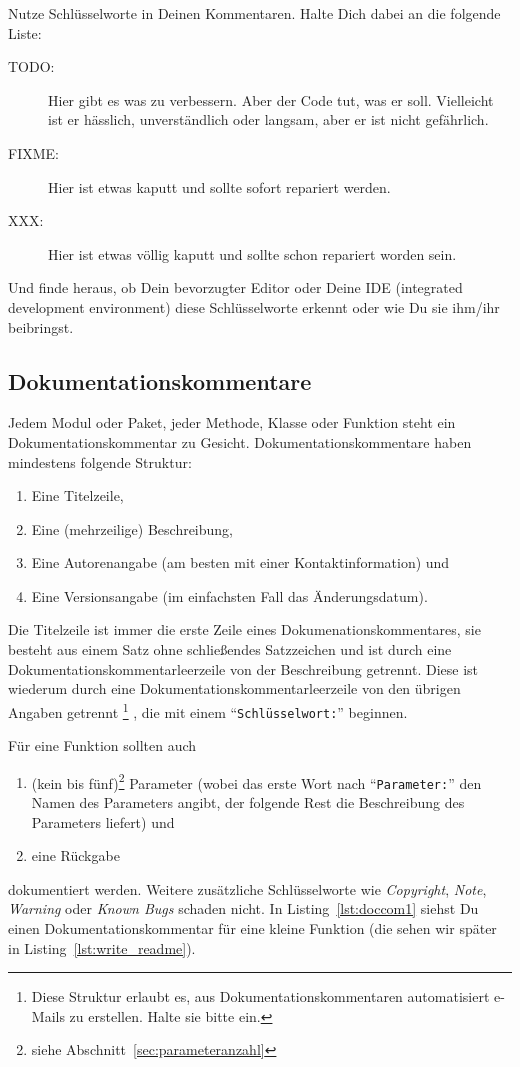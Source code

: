 \documentclass[twoside]{scrreprt}
\providecommand{\code}[1]{\texttt{#1}}
\begin{document}
Nutze Schl\"u{}sselworte in Deinen Kommentaren. Halte Dich dabei an die folgende
Liste:
\begin{description}
\item[TODO:] Hier gibt es was zu verbessern. Aber der Code tut, was er soll.
  Vielleicht ist er h\"a{}sslich, unverst\"a{}ndlich oder langsam,
  aber er ist nicht gef\"a{}hrlich.
\item[FIXME:] Hier ist etwas kaputt und sollte sofort repariert werden.
\item[XXX:] Hier ist etwas v\"o{}llig kaputt und sollte schon repariert
  worden sein.
\end{description}
Und finde heraus, ob Dein bevorzugter Editor oder Deine IDE (integrated
development environment) diese Schl\"u{}sselworte erkennt oder wie Du sie
ihm/ihr beibringst.

\subsection{Dokumentationskommentare\label{sec:doccom}}
Jedem Modul oder Paket, jeder Methode, Klasse oder Funktion steht ein
Dokumentationskommentar zu Gesicht. Dokumentationskommentare haben mindestens 
folgende Struktur:
\begin{enumerate}
    \item Eine Titelzeile,
    \item Eine (mehrzeilige) Beschreibung,
    \item Eine Autorenangabe (am besten mit einer Kontaktinformation) und
    \item Eine Versionsangabe (im einfachsten Fall das \"A{}nderungsdatum).
\end{enumerate}
Die Titelzeile ist immer die erste Zeile eines Dokumenationskommentares, sie
besteht aus einem Satz ohne schlie\ss{}endes Satzzeichen und ist durch eine
Dokumentationskommentarleerzeile von der Beschreibung getrennt. Diese ist
wiederum durch eine Dokumentationskommentarleerzeile von den \"u{}brigen Angaben
getrennt%
\footnote{Diese Struktur erlaubt es, aus Dokumentationskommentaren
automatisiert e-Mails zu erstellen. Halte sie bitte ein.}%
, die mit einem "`\code{Schl\"u{}sselwort:}"' beginnen.

F\"u{}r eine Funktion sollten auch 
\begin{enumerate}[resume]
    \item (kein bis f\"u{}nf)\footnote{siehe
	    Abschnitt~\ref{sec:parameteranzahl}} Parameter (wobei das erste Wort
	    nach "`\code{Parameter:}"' den Namen des Parameters angibt, der 
	    folgende Rest die Beschreibung des Parameters liefert) und 
    \item eine R\"u{}ckgabe
\end{enumerate}
dokumentiert werden. Weitere zus\"a{}tzliche Schl\"u{}sselworte wie 
\emph{Copyright}, \emph{Note}, \emph{Warning} oder \emph{Known Bugs} 
schaden nicht.
In Listing~\ref{lst:doccom1} siehst Du einen Dokumentationskommentar
f\"u{}r eine kleine Funktion (die sehen wir sp\"a{}ter in
Listing~\ref{lst:write_readme}).

\end{document}
